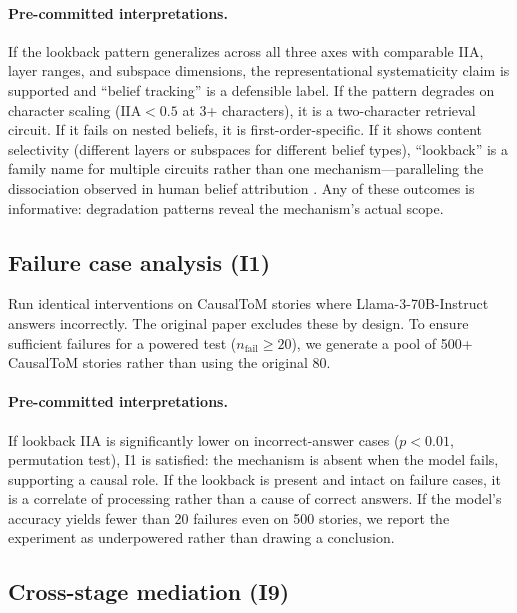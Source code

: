 \documentclass{article}
\begin{document}
\paragraph{Pre-committed interpretations.} If the lookback pattern generalizes across all three axes with comparable IIA, layer ranges, and subspace dimensions, the representational systematicity claim is supported and ``belief tracking'' is a defensible label. If the pattern degrades on character scaling ($\text{IIA} < 0.5$ at 3+ characters), it is a two-character retrieval circuit. If it fails on nested beliefs, it is first-order-specific. If it shows content selectivity (different layers or subspaces for different belief types), ``lookback'' is a family name for multiple circuits rather than one mechanism---paralleling the dissociation observed in human belief attribution \citep{apperly2009humans}. Any of these outcomes is informative: degradation patterns reveal the mechanism's actual scope.

\subsection{Failure case analysis (I1)}
\label{sec:failure}

Run identical interventions on CausalToM stories where Llama-3-70B-Instruct answers incorrectly. The original paper excludes these by design. To ensure sufficient failures for a powered test ($n_{\text{fail}} \geq 20$), we generate a pool of 500+ CausalToM stories rather than using the original 80.

\paragraph{Pre-committed interpretations.} If lookback IIA is significantly lower on incorrect-answer cases ($p < 0.01$, permutation test), I1 is satisfied: the mechanism is absent when the model fails, supporting a causal role. If the lookback is present and intact on failure cases, it is a correlate of processing rather than a cause of correct answers. If the model's accuracy yields fewer than 20 failures even on 500 stories, we report the experiment as underpowered rather than drawing a conclusion.

\subsection{Cross-stage mediation (I9)}
\label{sec:mediation}
\end{document}

